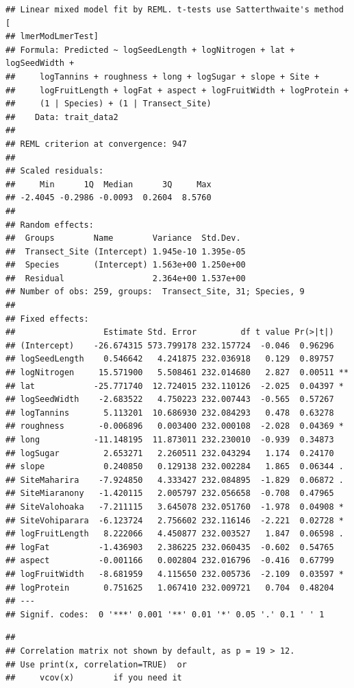 \documentclass[
  12pt,
]{article}
\begin{document}
\begin{verbatim}
## Linear mixed model fit by REML. t-tests use Satterthwaite's method [
## lmerModLmerTest]
## Formula: Predicted ~ logSeedLength + logNitrogen + lat + logSeedWidth +  
##     logTannins + roughness + long + logSugar + slope + Site +  
##     logFruitLength + logFat + aspect + logFruitWidth + logProtein +  
##     (1 | Species) + (1 | Transect_Site)
##    Data: trait_data2
## 
## REML criterion at convergence: 947
## 
## Scaled residuals: 
##     Min      1Q  Median      3Q     Max 
## -2.4045 -0.2986 -0.0093  0.2604  8.5760 
## 
## Random effects:
##  Groups        Name        Variance  Std.Dev. 
##  Transect_Site (Intercept) 1.945e-10 1.395e-05
##  Species       (Intercept) 1.563e+00 1.250e+00
##  Residual                  2.364e+00 1.537e+00
## Number of obs: 259, groups:  Transect_Site, 31; Species, 9
## 
## Fixed effects:
##                  Estimate Std. Error         df t value Pr(>|t|)   
## (Intercept)    -26.674315 573.799178 232.157724  -0.046  0.96296   
## logSeedLength    0.546642   4.241875 232.036918   0.129  0.89757   
## logNitrogen     15.571900   5.508461 232.014680   2.827  0.00511 **
## lat            -25.771740  12.724015 232.110126  -2.025  0.04397 * 
## logSeedWidth    -2.683522   4.750223 232.007443  -0.565  0.57267   
## logTannins       5.113201  10.686930 232.084293   0.478  0.63278   
## roughness       -0.006896   0.003400 232.000108  -2.028  0.04369 * 
## long           -11.148195  11.873011 232.230010  -0.939  0.34873   
## logSugar         2.653271   2.260511 232.043294   1.174  0.24170   
## slope            0.240850   0.129138 232.002284   1.865  0.06344 . 
## SiteMaharira    -7.924850   4.333427 232.084895  -1.829  0.06872 . 
## SiteMiaranony   -1.420115   2.005797 232.056658  -0.708  0.47965   
## SiteValohoaka   -7.211115   3.645078 232.051760  -1.978  0.04908 * 
## SiteVohiparara  -6.123724   2.756602 232.116146  -2.221  0.02728 * 
## logFruitLength   8.222066   4.450877 232.003527   1.847  0.06598 . 
## logFat          -1.436903   2.386225 232.060435  -0.602  0.54765   
## aspect          -0.001166   0.002804 232.016796  -0.416  0.67799   
## logFruitWidth   -8.681959   4.115650 232.005736  -2.109  0.03597 * 
## logProtein       0.751625   1.067410 232.009721   0.704  0.48204   
## ---
## Signif. codes:  0 '***' 0.001 '**' 0.01 '*' 0.05 '.' 0.1 ' ' 1
\end{verbatim}

\begin{verbatim}
## 
## Correlation matrix not shown by default, as p = 19 > 12.
## Use print(x, correlation=TRUE)  or
##     vcov(x)        if you need it
\end{verbatim}
\end{document}
